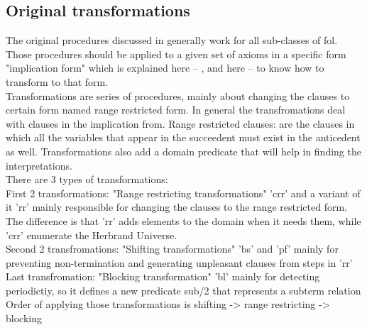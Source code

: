 \subsection{Original transformations}\label{sub:c3s1s1}
The original procedures discussed in \cite{BMUG06} generally work for all sub-classes of \ac{fol}.
Those procedures should be applied to a given set of axioms in a specific form "implication form" which is explained here -- , and here -- to know how to transform to that form.
\\
Transformations are series of procedures, mainly about changing the clauses to certain form named range restricted form. 
In general the transfromations deal with clauses in the implication from.
Range restricted clauses: are the clauses in which all the variables that appear in the succeedent must exist in the anticedent as well.
Transformations also add a domain predicate that will help in finding the interpretations.
\\
There are 3 types of transformations:
\\
First 2 transformations: "Range restricting transformations" 'crr' and a variant of it 'rr'
mainly responsible for changing the clauses to the range restricted form.
The difference is that 'rr' adds elements to the domain when it needs them, while 'crr' enumerate the Herbrand Universe.
\\
Second 2 transfromations: "Shifting transformations" 'bs' and 'pf'
mainly for preventing non-termination and generating unpleasant clauses from steps in 'rr' 
\\
Last transfromation: "Blocking transformation" 'bl'
mainly for detecting periodictiy, so it defines a new predicate sub/2 that represents a subterm relation
\\
Order of applying those transformations is shifting -> range restricting -> blocking
